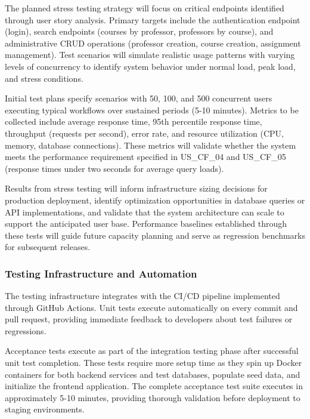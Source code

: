 \documentclass[12pt,a4paper]{article}
\begin{document}
The planned stress testing strategy will focus on critical endpoints identified through user story analysis. Primary targets include the authentication endpoint (login), search endpoints (courses by professor, professors by course), and administrative CRUD operations (professor creation, course creation, assignment management). Test scenarios will simulate realistic usage patterns with varying levels of concurrency to identify system behavior under normal load, peak load, and stress conditions.\newline

Initial test plans specify scenarios with 50, 100, and 500 concurrent users executing typical workflows over sustained periods (5-10 minutes). Metrics to be collected include average response time, 95th percentile response time, throughput (requests per second), error rate, and resource utilization (CPU, memory, database connections). These metrics will validate whether the system meets the performance requirement specified in US\_CF\_04 and US\_CF\_05 (response times under two seconds for average query loads).\newline

Results from stress testing will inform infrastructure sizing decisions for production deployment, identify optimization opportunities in database queries or API implementations, and validate that the system architecture can scale to support the anticipated user base. Performance baselines established through these tests will guide future capacity planning and serve as regression benchmarks for subsequent releases.

\subsubsection{Testing Infrastructure and Automation}

The testing infrastructure integrates with the CI/CD pipeline implemented through GitHub Actions. Unit tests execute automatically on every commit and pull request, providing immediate feedback to developers about test failures or regressions.\newline

Acceptance tests execute as part of the integration testing phase after successful unit test completion. These tests require more setup time as they spin up Docker containers for both backend services and test databases, populate seed data, and initialize the frontend application. The complete acceptance test suite executes in approximately 5-10 minutes, providing thorough validation before deployment to staging environments.\newline
\end{document}
